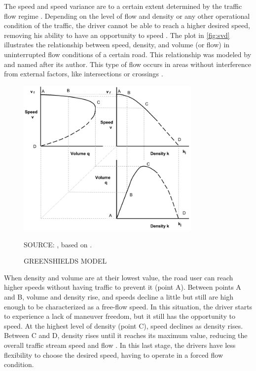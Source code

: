 The speed and speed variance are to a certain extent determined by the traffic flow regime \cite{Shinar2017}. Depending on the level of flow and density or any other operational condition of the traffic, the driver cannot be able to reach a higher desired speed, removing his ability to have an opportunity to speed \cite{Richard2013a, Bastos2021}. The plot in \autoref{fig:svd} illustrates the relationship between speed, density, and volume (or flow) in uninterrupted flow conditions of a certain road. This relationship was modeled by \textcite{Greenshields1934} and named after its author. This type of flow occurs in areas without interference from external factors, like intersections or crossings \cite{Green2020}. 

\begin{figure}[!htbp]
    \centering\footnotesize
    \captionsetup{font=footnotesize}
    \caption{GREENSHIELDS MODEL}
    \includegraphics[width=0.8\textwidth]{fig/svd.png}
    \label{fig:svd}
    \par SOURCE: \textcite{Green2020}, based on \textcite{Greenshields1934}.
\end{figure}

When density and volume are at their lowest value, the road user can reach higher speeds without having traffic to prevent it (point A). Between points A and B, volume and density rise, and speeds decline a little but still are high enough to be characterized as a free-flow speed. In this situation, the driver starts to experience a lack of maneuver freedom, but it still has the opportunity to speed. At the highest level of density (point C), speed declines as density rises. Between C and D, density rises until it reaches its maximum value, reducing the overall traffic stream speed and flow \cite{Green2020}. In this last stage, the drivers have less flexibility to choose the desired speed, having to operate in a forced flow condition. 

